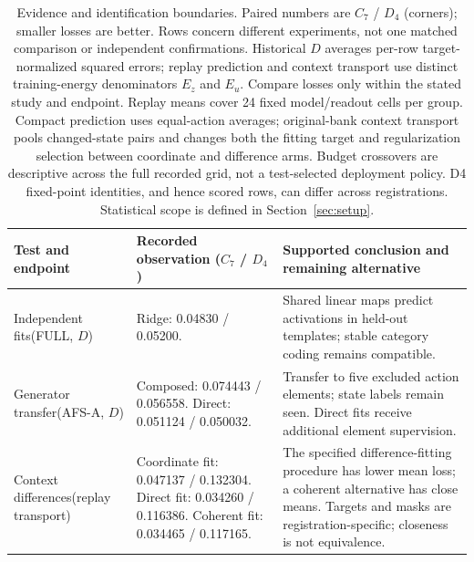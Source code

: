 \begin{table}[t]
\caption{Evidence and identification boundaries. Paired numbers are $C_7$ / $D_4$ (corners); smaller losses are better. Rows concern different experiments, not one matched comparison or independent confirmations. Historical $D$ averages per-row target-normalized squared errors; replay prediction and context transport use distinct training-energy denominators $E_z$ and $E_u$. Compare losses only within the stated study and endpoint. Replay means cover 24 fixed model/readout cells per group. Compact prediction uses equal-action averages; original-bank context transport pools changed-state pairs and changes both the fitting target and regularization selection between coordinate and difference arms. Budget crossovers are descriptive across the full recorded grid, not a test-selected deployment policy. D4 fixed-point identities, and hence scored rows, can differ across registrations. Statistical scope is defined in Section~\ref{sec:setup}.}
\label{tab:identification-summary}
\centering\small
\setlength{\tabcolsep}{4pt}
\renewcommand{\arraystretch}{1.10}
\begin{tabular}{@{}p{}p{}p{}@{}}
\toprule
Test and endpoint & Recorded observation ($C_7$ / $D_4$) & Supported conclusion and remaining alternative \\
\midrule
Independent fits\newline (FULL, $D$) & Ridge: 0.04830 / 0.05200. & Shared linear maps predict activations in held-out templates; stable category coding remains compatible. \\
\addlinespace[3pt]
Generator transfer\newline (AFS-A, $D$) & Composed: 0.074443 / 0.056558. \newline Direct: 0.051124 / 0.050032. & Transfer to five excluded action elements; state labels remain seen. Direct fits receive additional element supervision. \\
\addlinespace[3pt]
Context differences\newline (replay transport) & Coordinate fit: 0.047137 / 0.132304. \newline Direct fit: 0.034260 / 0.116386. \newline Coherent fit: 0.034465 / 0.117165. & The specified difference-fitting procedure has lower mean loss; a coherent alternative has close means. Targets and masks are registration-specific; closeness is not equivalence. \\

\end{tabular}
\end{table}
